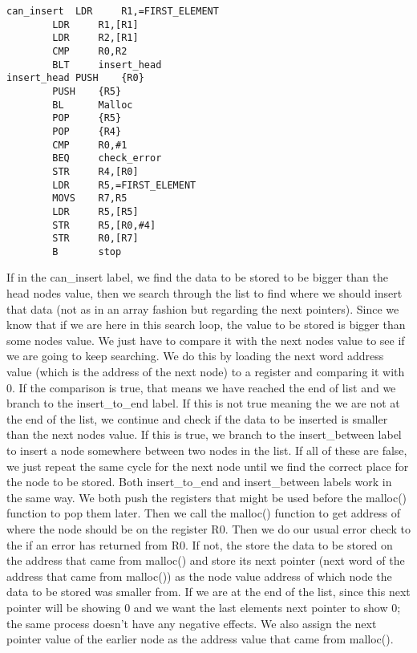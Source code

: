 \documentclass[pdftex,12pt,a4paper]{article}
\begin{document}
\begin{lstlisting}
can_insert	LDR     R1,=FIRST_ELEMENT		
		LDR     R1,[R1]					
		LDR     R2,[R1]						
		CMP     R0,R2						
		BLT     insert_head	
insert_head	PUSH    {R0}					
		PUSH    {R5}					
		BL      Malloc						
		POP     {R5}					
		POP     {R4}					
		CMP     R0,#1						
		BEQ     check_error					
		STR     R4,[R0]					
		LDR     R5,=FIRST_ELEMENT		
		MOVS    R7,R5					
		LDR     R5,[R5]					
		STR     R5,[R0,#4]				
		STR     R0,[R7]					
		B       stop
\end{lstlisting}

If in the can\_insert label, we find the data to be stored to be bigger than the head nodes value, then we search through the list to find where we should insert that data (not as in an array fashion but regarding the next pointers). Since we know that if we are here in this search loop, the value to be stored is bigger than some nodes value. We just have to compare it with the next nodes value to see if we are going to keep searching. We do this by loading the next word address value (which is the address of the next node) to a register and comparing it with 0. If the comparison is true, that means we have reached the end of list and we branch to the insert\_to\_end label. If this is not true meaning the we are not at the end of the list, we continue and check if the data to be inserted is smaller than the next nodes value. If this is true, we branch to the insert\_between label to insert a node somewhere between two nodes in the list. If all of these are false, we just repeat the same cycle for the next node until we find the correct place for the node to be stored. Both insert\_to\_end and insert\_between labels work in the same way. We both push the registers that might be used before the malloc() function to pop them later. Then we call the malloc() function to get address of where the node should be on the register R0. Then we do our usual error check to the if an error has returned from R0. If not, the store the data to be stored on the address that came from malloc() and store its next pointer (next word of the address that came from malloc()) as the node value address of which node the data to be stored was smaller from. If we are at the end of the list, since this next pointer will be showing 0 and we want the last elements next pointer to show 0; the same process doesn't have any negative effects. We also assign the next pointer value of the earlier node as the address value that came from malloc().
\end{document}
